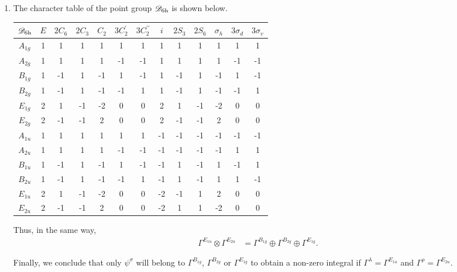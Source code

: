 \documentclass[a4paper]{book}
\begin{document}
\begin{solution}
\begin{enumerate}[label=(\alph*)]
		\item The character table of the point group $\mathscr{D}_{\rm 6h}$ is shown below.
		\begin{center}
		\begin{tabular}{ccccccccccccc}\hline
	$\mathscr{D}_{\rm 6h}$ & $E$ & $2C_6$ & $2C_3$ & $C_2$ & $3C^\prime_2 $ & $3C^{\prime\prime}_2$ & $i$ & $2S_3$ & $2S_6$ & $\sigma_h$ & $3\sigma_d$ & $3\sigma_v$ \\ \hline
			$A_{1g}$ & 1 & 1 & 1 & 1 & 1 & 1 & 1 & 1 & 1 & 1 & 1 & 1 \\
			$A_{2g}$ & 1 & 1 & 1 & 1 & -1 & -1 & 1 & 1 & 1 & 1 & -1 & -1 \\
			$B_{1g}$ & 1 & -1 & 1 & -1 & 1 & -1 & 1 & -1 & 1 & -1 & 1 & -1 \\
			$B_{2g}$ & 1 & -1 & 1 & -1 & -1 & 1 & 1 & -1 & 1 & -1 & -1 & 1 \\
			$E_{1g}$ & 2 & 1 & -1 & -2 & 0 & 0 & 2 & 1 & -1 & -2 & 0 & 0 \\
			$E_{2g}$ & 2 & -1 & -1 & 2 & 0 & 0 & 2 & -1 & -1 & 2 & 0 & 0 \\
			$A_{1u}$ & 1 & 1 & 1 & 1 & 1 & 1 & -1 & -1 & -1 & -1 & -1 & -1 \\
			$A_{2u}$ & 1 & 1 & 1 & 1 & -1 & -1 & -1 & -1 & -1 & -1 & 1 & 1 \\
			$B_{1u}$ & 1 & -1 & 1 & -1 & 1 & -1 & -1 & 1 & -1 & 1 & -1 & 1 \\
			$B_{2u}$ & 1 & -1 & 1 & -1 & -1 & 1 & -1 & 1 & -1 & 1 & 1 & -1 \\
			$E_{1u}$ & 2 & 1 & -1 & -2 & 0 & 0 & -2 & -1 & 1 & 2 & 0 & 0 \\
			$E_{2u}$ & 2 & -1 & -1 & 2 & 0 & 0 & -2 & 1 & 1 & -2 & 0 & 0 \\ \hline
		\end{tabular}
		\end{center}
		Thus, in the same way,
		\begin{align}
			\Gamma^{E_{1u}} \otimes \Gamma^{E_{2u}} &= \Gamma^{B_{1g}} \oplus \Gamma^{B_{2g}} \oplus \Gamma^{E_{1g}}.
		\end{align}
		
		Finally, we conclude that only $\psi^\sigma$ will belong to $\Gamma^{B_{1g}}$, $\Gamma^{B_{2g}}$ or $\Gamma^{E_{1g}}$ to obtain a non-zero integral if $\Gamma^\lambda = \Gamma^{E_{1u}}$ and $\Gamma^\rho = \Gamma^{E_{2u}}$.
		

\end{enumerate}
\end{solution}
\end{document}
